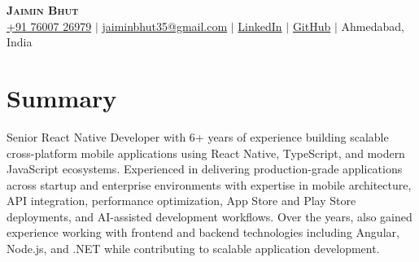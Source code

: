 \documentclass[letterpaper,11pt]{article}
\begin{document}

\begin{center}
    \textbf{\Huge \scshape Jaimin Bhut} \\ \vspace{3pt}
    \small
    \faMobile \hspace{.5pt} \href{tel:917600726979}{+91 76007 26979}
    $|$
    \faAt \hspace{.5pt} \href{mailto:jaiminbhut35@gmail.com}{jaiminbhut35@gmail.com}
    $|$
    \faLinkedinSquare \hspace{.5pt} \href{https://www.linkedin.com/in/jaimin-bhut}{LinkedIn}
    $|$
    \faGithub \hspace{.5pt} \href{https://github.com/jaiminbhut}{GitHub}
    $|$
    \faMapMarker \hspace{.5pt} Ahmedabad, India
\end{center}


\section{Summary}
\vspace{2pt}
\small{Senior React Native Developer with 6+ years of experience building scalable cross-platform mobile applications using React Native, TypeScript, and modern JavaScript ecosystems. Experienced in delivering production-grade applications across startup and enterprise environments with expertise in mobile architecture, API integration, performance optimization, App Store and Play Store deployments, and AI-assisted development workflows. Over the years, also gained experience working with frontend and backend technologies including Angular, Node.js, and .NET while contributing to scalable application development.}

\end{document}
